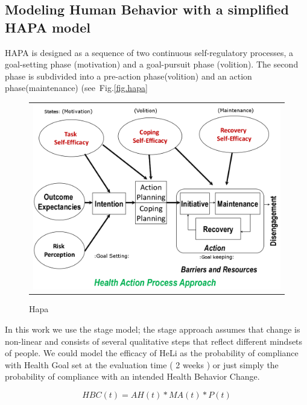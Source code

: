 \documentclass{llncs}
\begin{document}
\subsection{Modeling Human Behavior with a simplified HAPA model}

HAPA is designed as a sequence of two continuous self-regulatory processes, a goal-setting phase (motivation) and a goal-pursuit phase (volition). The second phase is subdivided into a pre-action phase(volition) and an action phase(maintenance) (see~Fig.\ref{fig.hapa}

\begin{figure}
  \begin{center}
  \begin{tabular}{c}
    \includegraphics[scale=0.5]{hapa_firem.png}\\
    \end{tabular}
    \caption{Hapa \cite{rem2012}}
     \label{Fig.hapa}
\end{center}
\end{figure} 

In this work we use the stage model; the stage approach assumes that change is non-linear and consists of several qualitative steps that reflect different mindsets of people.
We could model the efficacy of HeLi as the probability of compliance with Health Goal set at the evaluation time ( 2 weeks ) or just simply the probability of compliance with an intended Health Behavior Change.

\begin{equation}
 	HBC(t) =  AH(t) * MA(t) * P(t)
\label{Eq.HBChange}
\end{equation}
\end{document}
